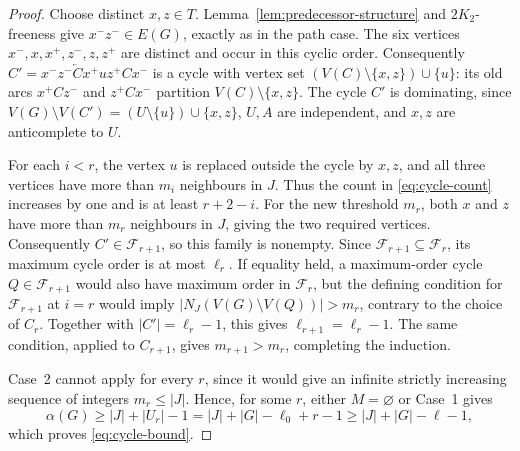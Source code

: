 \documentclass[11pt]{article}
\numberwithin{equation}{section}
\theoremstyle{plain}
\theoremstyle{definition}
\theoremstyle{plain}
\begin{document}
\begin{proof}
Choose distinct $x,z\in T$.
Lemma~\ref{lem:predecessor-structure} and $2K_2$-freeness give
$x^-z^-\in E(G)$, exactly as in the path case. The six vertices
$x^-,x,x^+,z^-,z,z^+$ are distinct and occur in this cyclic order.
Consequently
    $C'=x^-z^-\overleftarrow C x^+uz^+C x^-$
is a cycle with vertex set $(V(C)\setminus\{x,z\})\cup\{u\}$:
its old arcs $x^+Cz^-$ and $z^+Cx^-$ partition
$V(C)\setminus\{x,z\}$. The cycle $C'$ is dominating, since
$V(G)\setminus V(C')=(U\setminus\{u\})\cup\{x,z\}$,
$U,A$ are independent, and $x,z$ are anticomplete to $U$.

For each $i<r$, the vertex $u$ is replaced outside the cycle by
$x,z$, and all three vertices have more than $m_i$ neighbours in $J$.
Thus the count in \eqref{eq:cycle-count} increases by one and is at least $r+2-i$.
For the new threshold $m_r$, both $x$ and $z$ have more than $m_r$
neighbours in $J$, giving the two required vertices.
Consequently $C'\in\mathcal F_{r+1}$, so this family is nonempty.
Since $\mathcal F_{r+1}\subseteq\mathcal F_r$, its maximum cycle
order is at most $\ell_r$. If equality held, a maximum-order cycle
$Q\in\mathcal F_{r+1}$ would also have maximum order in
$\mathcal F_r$, but the defining condition for $\mathcal F_{r+1}$
at $i=r$ would imply
$ |N_J(V(G)\setminus V(Q))|>m_r$,
contrary to the choice of $C_r$.
Together with $|C'|=\ell_r-1$, this gives
$\ell_{r+1}=\ell_r-1$. The same condition, applied to $C_{r+1}$,
gives $m_{r+1}>m_r$, completing the induction.

Case~2 cannot apply for every $r$, since it would give an infinite
strictly increasing sequence of integers $m_r\leq|J|$. Hence, for
some $r$, either $M=\varnothing$ or Case~1 gives
\[
    \alpha(G)\geq |J|+|U_r|-1
    =|J|+|G|-\ell_0+r-1
    \geq |J|+|G|-\ell-1,
\]
which proves \eqref{eq:cycle-bound}.
\end{proof}
\end{document}

